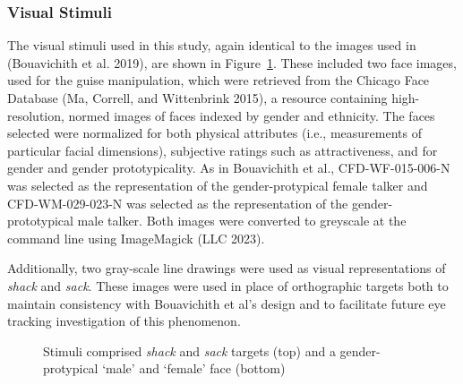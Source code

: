 \documentclass[
  letterpaper,
  DIV=11,
  numbers=noendperiod]{scrartcl}
\begin{document}
\subsubsection{Visual Stimuli}\label{sub-stimuli-visual}

The visual stimuli used in this study, again identical to the images
used in (Bouavichith et al. 2019), are shown in Figure~\ref{fig-visual}.
These included two face images, used for the guise manipulation, which
were retrieved from the Chicago Face Database (Ma, Correll, and
Wittenbrink 2015), a resource containing high-resolution, normed images
of faces indexed by gender and ethnicity. The faces selected were
normalized for both physical attributes (i.e., measurements of
particular facial dimensions), subjective ratings such as
attractiveness, and for gender and gender prototypicality. As in
Bouavichith et al., CFD-WF-015-006-N was selected as the representation
of the gender-protypical female talker and CFD-WM-029-023-N was selected
as the representation of the gender-prototypical male talker. Both
images were converted to greyscale at the command line using ImageMagick
(LLC 2023).

Additionally, two gray-scale line drawings were used as visual
representations of \emph{shack} and \emph{sack}. These images were used
in place of orthographic targets both to maintain consistency with
Bouavichith et al's design and to facilitate future eye tracking
investigation of this phenomenon.

\begin{figure}


\caption{\label{fig-visual}Stimuli comprised \emph{shack} and
\emph{sack} targets (top) and a gender-protypical `male' and `female'
face (bottom)}

\end{figure}%
\end{document}
